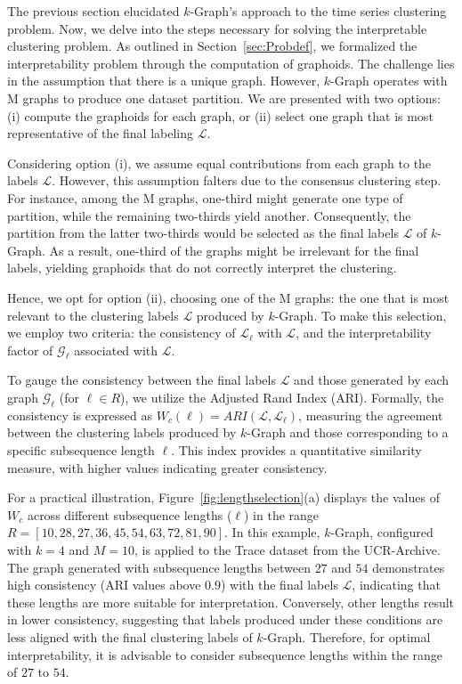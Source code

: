 The previous section elucidated $k$-Graph's approach to the time series clustering problem. 
Now, we delve into the steps necessary for solving the interpretable clustering problem. 
As outlined in Section~\ref{sec:Probdef}, we formalized the interpretability problem through the computation of graphoids. 
The challenge lies in the assumption that there is a unique graph. 
However, $k$-Graph operates with M graphs to produce one dataset partition. 
We are presented with two options: (i) compute the graphoids for each graph, or (ii) select one graph that is most representative of the final labeling $\mathcal{L}$.

Considering option (i), we assume equal contributions from each graph to the labels $\mathcal{L}$. 
However, this assumption falters due to the consensus clustering step. 
For instance, among the M graphs, one-third might generate one type of partition, while the remaining two-thirds yield another. 
Consequently, the partition from the latter two-thirds would be selected as the final labels $\mathcal{L}$ of $k$-Graph. 
As a result, one-third of the graphs might be irrelevant for the final labels, yielding graphoids that do not correctly interpret the clustering.

Hence, we opt for option (ii), choosing one of the M graphs: the one that is most relevant to the clustering labels $\mathcal{L}$ produced by $k$-Graph. 
To make this selection, we employ two criteria: the consistency of $\mathcal{L}_\ell$ with $\mathcal{L}$, and the interpretability factor of $\mathcal{G}_\ell$ associated with $\mathcal{L}$.

\noindent{\bf [Consistency]} To gauge the consistency between the final labels $\mathcal{L}$ and those generated by each graph $\mathcal{G}_\ell$ (for $\ell \in R$), we utilize the Adjusted Rand Index (ARI).  Formally, the consistency is expressed as $W_c(\ell) = ARI(\mathcal{L},\mathcal{L}_\ell)$, measuring the agreement between the clustering labels produced by $k$-Graph and those corresponding to a specific subsequence length $\ell$. 
This index provides a quantitative similarity measure, with higher values indicating greater consistency.

For a practical illustration, Figure~\ref{fig:lengthselection}(a) displays the values of $W_c$ across different subsequence lengths ($\ell$) in the range $R=[10,28,27,36,45,54,63,72,81,90]$. 
In this example, $k$-Graph, configured with $k=4$ and $M=10$, is applied to the Trace dataset from the UCR-Archive. 
The graph generated with subsequence lengths between $27$ and $54$ demonstrates high consistency (ARI values above $0.9$) with the final labels $\mathcal{L}$, indicating that these lengths are more suitable for interpretation. 
Conversely, other lengths result in lower consistency, suggesting that labels produced under these conditions are less aligned with the final clustering labels of $k$-Graph. 
Therefore, for optimal interpretability, it is advisable to consider subsequence lengths within the range of $27$ to $54$.

